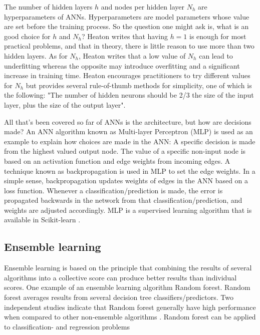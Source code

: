 			The number of hidden layers $h$ and nodes per hidden layer $N_h$ are hyperparameters of ANNs. Hyperparameters are model parameters whose value are set before the training process. So the question one might ask is, what is an good choice for $h$ and $N_h$? Heaton \cite{BOOK:10} writes that having $h=1$ is enough for most practical problems, and that in theory, there is little reason to use more than two hidden layers. As for $N_h$, Heaton writes that a low value of $N_h$ can lead to underfitting whereas the opposite may introduce overfitting and a significant increase in training time. Heaton encourages practitioners to try different values for $N_h$ but provides several rule-of-thumb methods for simplicity, one of which is the following: "The number of hidden neurons should be 2/3 the size of the input layer, plus the size of the output layer". %

			All that's been covered so far of ANNs is the architecture, but how are decisions made? An ANN algorithm known as Multi-layer Perceptron (MLP) is used as an example to explain how choices are made in the ANN: A specific decision is made from the highest valued output node. The value of a specific non-input node is based on an activation function and edge weights from incoming edges. 
A technique known as backpropagation is used in MLP to set the edge weights. In a simple sense, backpropagation updates weights of edges in the ANN based on a loss function. Whenever a classification/prediction is made, the error is propagated backwards in the network from that classification/prediction, and weights are adjusted accordingly. MLP is a supervised learning algorithm that is available in Scikit-learn \cite{WEBSITE:32}.

	\subsection{Ensemble learning}
		Ensemble learning is based on the principle that combining the results of several algorithms into a collective score can produce better results than individual scores. One example of an ensemble learning algorithm Random forest. Random forest averages results from several decision tree classifiers/predictors. Two independent studies indicate that Random forest generally have high performance when compared to other non-ensemble algorithms \cite{ARTICLE:16, IP:5}. Random forest can be applied to classification- and regression problems \cite{WEBSITE:17}


